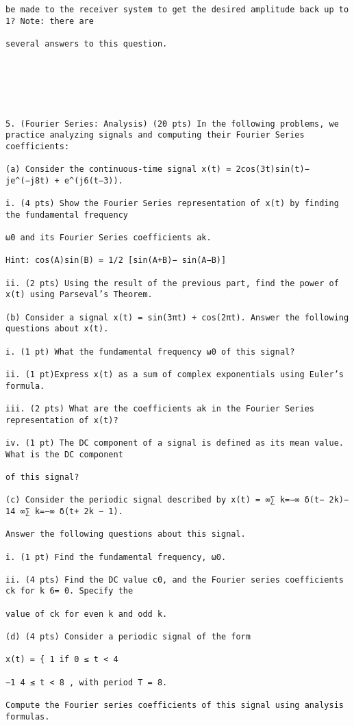 \documentclass[11pt,addpoints]{exam}
\begin{document}
\begin{verbatim}
be made to the receiver system to get the desired amplitude back up to 1? Note: there are

several answers to this question.






5. (Fourier Series: Analysis) (20 pts) In the following problems, we practice analyzing signals and computing their Fourier Series coefficients:

(a) Consider the continuous-time signal x(t) = 2cos(3t)sin(t)− je^(−j8t) + e^(j6(t−3)).

i. (4 pts) Show the Fourier Series representation of x(t) by finding the fundamental frequency

ω0 and its Fourier Series coefficients ak.

Hint: cos(A)sin(B) = 1/2 [sin(A+B)− sin(A−B)]

ii. (2 pts) Using the result of the previous part, find the power of x(t) using Parseval’s Theorem.

(b) Consider a signal x(t) = sin(3πt) + cos(2πt). Answer the following questions about x(t).

i. (1 pt) What the fundamental frequency ω0 of this signal?

ii. (1 pt)Express x(t) as a sum of complex exponentials using Euler’s formula.

iii. (2 pts) What are the coefficients ak in the Fourier Series representation of x(t)?

iv. (1 pt) The DC component of a signal is defined as its mean value. What is the DC component

of this signal?

(c) Consider the periodic signal described by x(t) = ∞∑ k=−∞ δ(t− 2k)− 14 ∞∑ k=−∞ δ(t+ 2k − 1). 

Answer the following questions about this signal.

i. (1 pt) Find the fundamental frequency, ω0.

ii. (4 pts) Find the DC value c0, and the Fourier series coefficients ck for k 6= 0. Specify the

value of ck for even k and odd k.

(d) (4 pts) Consider a periodic signal of the form 

x(t) = { 1 if 0 ≤ t < 4

−1 4 ≤ t < 8 , with period T = 8.

Compute the Fourier series coefficients of this signal using analysis formulas.







\end{verbatim}
\end{document}
